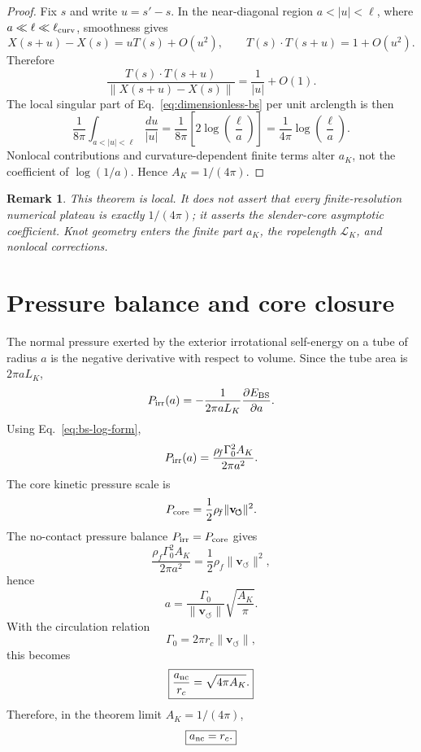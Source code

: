 \documentclass[11pt]{article}
\newcommand{\vnorm}{\lVert\mathbf{v}_{\!\boldsymbol{\circlearrowleft}}\rVert}
\newcommand{\rhof}{\rho_{\!f}}
\newcommand{\rc}{r_c}
\newcommand{\LK}{\mathcal L_K}
\newtheorem{remark}{Remark}
\begin{document}
\begin{proof}
Fix \(s\) and write \(u=s'-s\).  In the near-diagonal region
\(a<|u|<\ell\), where \(a\ll \ell\ll\ell_{\rm curv}\), smoothness gives
\[
  X(s+u)-X(s)=uT(s)+O(u^2),
  \qquad
  T(s)\cdot T(s+u)=1+O(u^2).
\]
Therefore
\[
  \frac{T(s)\cdot T(s+u)}{\lVert X(s+u)-X(s)\rVert}
  =
  \frac{1}{|u|}+O(1).
\]
The local singular part of Eq.~\eqref{eq:dimensionless-bs} per unit arclength is then
\[
  \frac{1}{8\pi}
  \int_{a<|u|<\ell}\frac{du}{|u|}
  =
  \frac{1}{8\pi}
  \left[
  2\log\!\left(\frac{\ell}{a}\right)
  \right]
  =
  \frac{1}{4\pi}\log\!\left(\frac{\ell}{a}\right).
\]
Nonlocal contributions and curvature-dependent finite terms alter \(a_K\), not the coefficient
of \(\log(1/a)\).  Hence \(A_K=1/(4\pi)\).
\end{proof}

\begin{remark}
This theorem is local.  It does not assert that every finite-resolution numerical plateau is
exactly \(1/(4\pi)\); it asserts the slender-core asymptotic coefficient.  Knot geometry enters
the finite part \(a_K\), the ropelength \(\LK\), and nonlocal corrections.
\end{remark}

\section{Pressure balance and core closure}
\label{sec:pressure}

The normal pressure exerted by the exterior irrotational self-energy on a tube of radius \(a\)
is the negative derivative with respect to volume.  Since the tube area is \(2\pi aL_K\),
\begin{equation}
  P_{\rm irr}(a)
  =
  -\frac{1}{2\pi aL_K}\frac{\partial E_{\rm BS}}{\partial a}.
\end{equation}
Using Eq.~\eqref{eq:bs-log-form},
\begin{equation}
  P_{\rm irr}(a)
  =
  \frac{\rhof\Gamma_0^2A_K}{2\pi a^2}.
  \label{eq:Pirr}
\end{equation}
The core kinetic pressure scale is
\begin{equation}
  P_{\rm core}
  =
  \frac{1}{2}\rhof\vnorm^2.
  \label{eq:Pcore}
\end{equation}
The no-contact pressure balance \(P_{\rm irr}=P_{\rm core}\) gives
\begin{equation}
  \frac{\rhof\Gamma_0^2A_K}{2\pi a^2}
  =
  \frac{1}{2}\rhof\vnorm^2,
\end{equation}
hence
\begin{equation}
  a
  =
  \frac{\Gamma_0}{\vnorm}\sqrt{\frac{A_K}{\pi}}.
\end{equation}
With the circulation relation
\begin{equation}
  \Gamma_0=2\pi \rc\vnorm,
  \label{eq:gamma-relation}
\end{equation}
this becomes
\begin{equation}
  \boxed{\frac{a_{\rm nc}}{\rc}=\sqrt{4\pi A_K}.}
  \label{eq:anc}
\end{equation}
Therefore, in the theorem limit \(A_K=1/(4\pi)\),
\begin{equation}
  \boxed{a_{\rm nc}=\rc.}
\end{equation}
\end{document}
